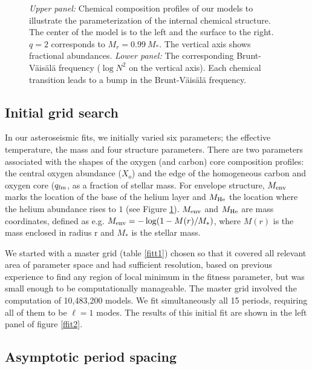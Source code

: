 \documentclass[12pt,preprint]{aastex}
\newcommand{\bvf}{Brunt-V\"ais\"al\"a }
\begin{document}
\begin{figure}
\caption{
{\em Upper panel:} Chemical composition profiles of our models to illustrate the parameterization 
of the internal chemical structure. The center of the model is to the left and the surface to 
the right.  $q=2$ corresponds to $M_r = 0.99 \: M_*$. The vertical axis shows fractional abundances. 
{\em Lower panel:} The corresponding \bvf frequency ($\log{N^2}$ on the vertical axis). Each 
chemical transition leads to a bump in the \bvf frequency. \label{ffit1}
}
\end{figure}

\subsection{Initial grid search}
\label{grids}

In our asteroseismic fits, we initially varied six parameters; the effective temperature, 
the mass and four structure parameters. There are two parameters associated with the shapes 
of the oxygen (and carbon) core composition profiles: the central oxygen abundance ($X_o$) and 
the edge of the homogeneous carbon and oxygen core ($q_{\rm fm}$, as a fraction of stellar mass. 
For envelope structure, $M_{\rm env}$ marks the location of the base of the helium layer 
and $M_{\rm He}$ the location where the helium abundance rises to $1$ (see Figure \ref{ffit1}). 
$M_{\rm env}$ and $M_{\rm He}$ are mass coordinates, defined as e.g. 
$M_{\rm env} = -\log(1 - M(r)/M_*)$, where $M(r)$ is the mass enclosed in radius r and 
$M_*$ is the stellar mass. 



We started with a master grid (table \ref{fitt1}) chosen so that it covered all relevant 
area of parameter space and had sufficient resolution, based on previous experience 
\citep{Bischoff-Kim11a,Bischoff-Kim14} to find any region of local minimum in the fitness parameter, 
but was small enough to be computationally manageable. The master grid involved the computation 
of 10,483,200 models. We fit simultaneously all 15 periods, requiring all of them to be $\ell=1$ 
modes. The results of this initial fit are shown in the left panel of figure \ref{ffit2}.

\subsection{Asymptotic period spacing}
\label{periodspacing}
\end{document}
